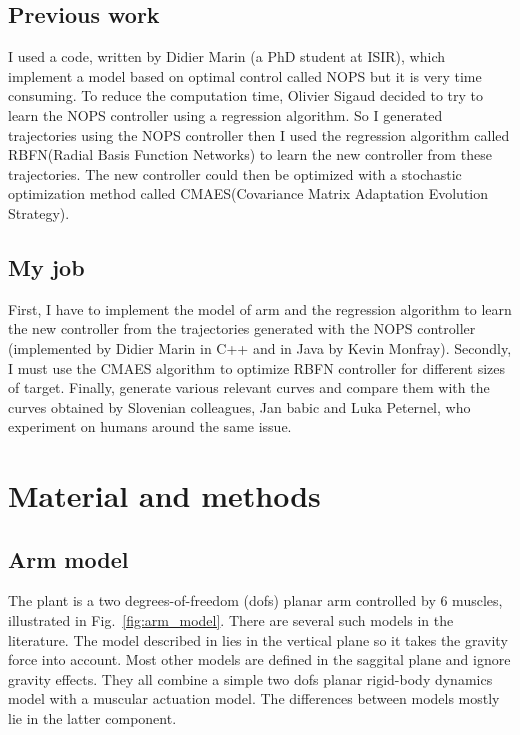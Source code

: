 \documentclass[pdftex,a4paper,11pt]{report}
\begin{document}
\section{Previous work}
I used a code, written by Didier Marin (a PhD student at ISIR), which implement a model based on optimal control called NOPS but it is very time consuming.
To reduce the computation time, Olivier Sigaud decided to try to learn the NOPS controller using a regression algorithm.
So I generated trajectories using the NOPS controller then I used the regression algorithm called RBFN(Radial Basis Function Networks) to learn the new controller from these trajectories.
The new controller could then be optimized with a stochastic optimization method called CMAES(Covariance Matrix Adaptation Evolution Strategy).

\section{My job}
First, I have to implement the model of arm and the regression algorithm to learn the new controller from the trajectories generated with the NOPS controller (implemented by Didier Marin in C++ and in Java by Kevin Monfray).
Secondly, I must use the CMAES algorithm to optimize RBFN controller for different sizes of target.
Finally, generate various relevant curves and compare them with the curves obtained by Slovenian colleagues, Jan babic and Luka Peternel, who experiment on humans around the same issue.

\chapter{Material and methods}

\section{Arm model}
\label{sec_ArmModel}

The plant is a two degrees-of-freedom (dofs) planar arm controlled by 6 muscles, illustrated in Fig.~\ref{fig:arm_model}.
There are several such models in the literature. The model described in \cite{Kambara2009} lies in the vertical
plane so it takes the gravity force into account. Most other models are defined in the saggital plane and
ignore gravity effects. They all combine a simple two dofs planar rigid-body dynamics model with a 
muscular actuation model. The differences between models mostly lie in the latter component.
\end{document}
